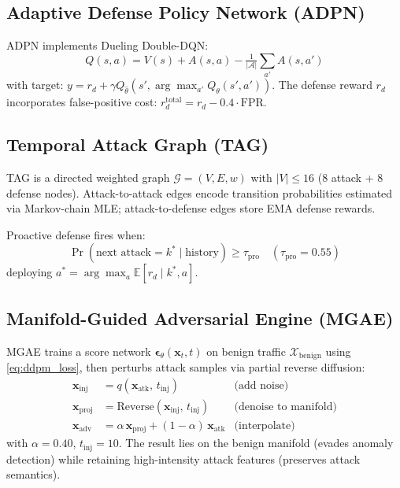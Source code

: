 \documentclass[conference]{IEEEtran}
\newcommand{\adpn}{\textsc{ADPN}}
\newcommand{\tagraph}{\textsc{TAG}}
\newcommand{\mgae}{\textsc{MGAE}}
\newcommand{\E}{\mathbb{E}}
\begin{document}
\subsection{Adaptive Defense Policy Network (\adpn{})}
\label{sec:adpn}

\adpn{} implements Dueling Double-DQN:
\begin{equation}
  Q(s,a) = V(s) + A(s,a) - \tfrac{1}{|\mathcal{A}|}\textstyle\sum_{a'} A(s,a')
\end{equation}
with target:
$y = r_d + \gamma Q_{\hat\theta}(s', \arg\max_{a'} Q_\theta(s',a'))$.
The defense reward $r_d$ incorporates false-positive cost:
$r_d^{\mathrm{total}} = r_d - 0.4 \cdot \mathrm{FPR}$.

\subsection{Temporal Attack Graph (\tagraph{})}
\label{sec:tag}

\tagraph{} is a directed weighted graph $\mathcal{G} = (V, E, w)$
with $|V| \leq 16$ (8 attack + 8 defense nodes).
Attack-to-attack edges encode transition probabilities estimated via
Markov-chain MLE; attack-to-defense edges store EMA defense rewards.

Proactive defense fires when:
\begin{equation}
  \Pr(\text{next attack} = k^* \mid \text{history}) \geq \tau_{\mathrm{pro}}
  \quad (\tau_{\mathrm{pro}} = 0.55)
\end{equation}
deploying $a^* = \arg\max_a \E[r_d \mid k^*, a]$.

\subsection{Manifold-Guided Adversarial Engine (\mgae{})}
\label{sec:mgae}

\mgae{} trains a score network $\boldsymbol\epsilon_\theta(\mathbf{x}_t, t)$
on benign traffic $\mathcal{X}_{\mathrm{benign}}$ using
\eqref{eq:ddpm_loss}, then perturbs attack samples via partial reverse
diffusion:
\begin{align}
  \mathbf{x}_{\mathrm{inj}} &= q(\mathbf{x}_{\mathrm{atk}},\, t_{\mathrm{inj}})
    & \text{(add noise)}\\
  \mathbf{x}_{\mathrm{proj}} &= \mathrm{Reverse}(\mathbf{x}_{\mathrm{inj}},\, t_{\mathrm{inj}})
    & \text{(denoise to manifold)}\\
  \mathbf{x}_{\mathrm{adv}} &= \alpha\,\mathbf{x}_{\mathrm{proj}} +
    (1-\alpha)\,\mathbf{x}_{\mathrm{atk}}
    & \text{(interpolate)}
\end{align}
with $\alpha=0.40$, $t_{\mathrm{inj}}=10$.
The result lies on the benign manifold (evades anomaly detection)
while retaining high-intensity attack features (preserves attack semantics).
\end{document}
